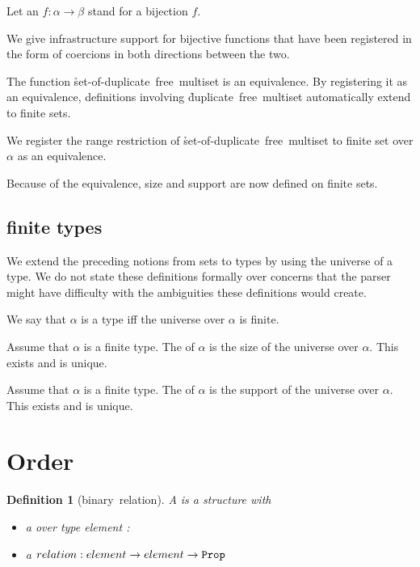 \documentclass[12pt]{article}
\newtheorem{definition}{Definition}
\begin{document}
\begin{cnl}
Let an  $f:\alpha\to\beta$ stand for a bijection $f$.

\begin{remark} 
We give infrastructure support for bijective functions that have been
registered in the form of coercions in both directions between the
two.

The function \h{set-of-duplicate~free~multiset} is an equivalence.  By
registering it as an equivalence, definitions involving
\h{duplicate~free~multiset} automatically extend to finite sets.
\end{remark}

We register the range restriction of \h{set-of-duplicate~free~multiset} to
finite set over $\alpha$ as an equivalence.

\begin{remark} 
Because of the equivalence, size and support are now defined on finite
sets.
\end{remark}

\subsection{finite types}

\begin{remark}
We extend the preceding notions from sets to types by using the
universe of a type.  We do not state these definitions formally over
concerns that the parser might have difficulty with the ambiguities
these definitions would create.

We say that $\alpha$ is a  type iff the universe over $\alpha$ is finite.

Assume that $\alpha$ is a finite type.  The  of $\alpha$ is
the size of the universe over $\alpha$.  This exists and is unique.

Assume that $\alpha$ is a finite type.  The  of $\alpha$
is the support of the universe over $\alpha$.  This exists and is
unique.

\end{remark}


\newpage
\section{Order}

\begin{definition}[binary~relation]
A  is a structure with
\begin{itemize}
\item a over type element : \Type
\item a $relation : element \to element \to \text{\tt Prop}$
  \end{itemize}
\end{definition}
    

\end{cnl}
\end{document}
